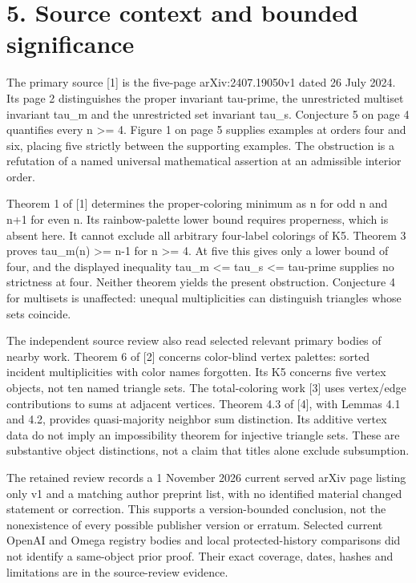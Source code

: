 \documentclass[10pt]{article}
\begin{document}
\clearpage
\section*{5. Source context and bounded significance}
The primary source [1] is the five-page arXiv:2407.19050v1 dated 26 July 2024. Its page 2 distinguishes the proper invariant tau-prime, the unrestricted multiset invariant tau\_m and the unrestricted set invariant tau\_s. Conjecture 5 on page 4 quantifies every n >= 4. Figure 1 on page 5 supplies examples at orders four and six, placing five strictly between the supporting examples. The obstruction is a refutation of a named universal mathematical assertion at an admissible interior order.


Theorem 1 of [1] determines the proper-coloring minimum as n for odd n and n+1 for even n. Its rainbow-palette lower bound requires properness, which is absent here. It cannot exclude all arbitrary four-label colorings of K5. Theorem 3 proves tau\_m(n) >= n-1 for n >= 4. At five this gives only a lower bound of four, and the displayed inequality tau\_m <= tau\_s <= tau-prime supplies no strictness at four. Neither theorem yields the present obstruction. Conjecture 4 for multisets is unaffected: unequal multiplicities can distinguish triangles whose sets coincide.


The independent source review also read selected relevant primary bodies of nearby work. Theorem 6 of [2] concerns color-blind vertex palettes: sorted incident multiplicities with color names forgotten. Its K5 concerns five vertex objects, not ten named triangle sets. The total-coloring work [3] uses vertex/edge contributions to sums at adjacent vertices. Theorem 4.3 of [4], with Lemmas 4.1 and 4.2, provides quasi-majority neighbor sum distinction. Its additive vertex data do not imply an impossibility theorem for injective triangle sets. These are substantive object distinctions, not a claim that titles alone exclude subsumption.


The retained review records a 1 November 2026 current served arXiv page listing only v1 and a matching author preprint list, with no identified material changed statement or correction. This supports a version-bounded conclusion, not the nonexistence of every possible publisher version or erratum. Selected current OpenAI and Omega registry bodies and local protected-history comparisons did not identify a same-object prior proof. Their exact coverage, dates, hashes and limitations are in the source-review evidence.
\end{document}

